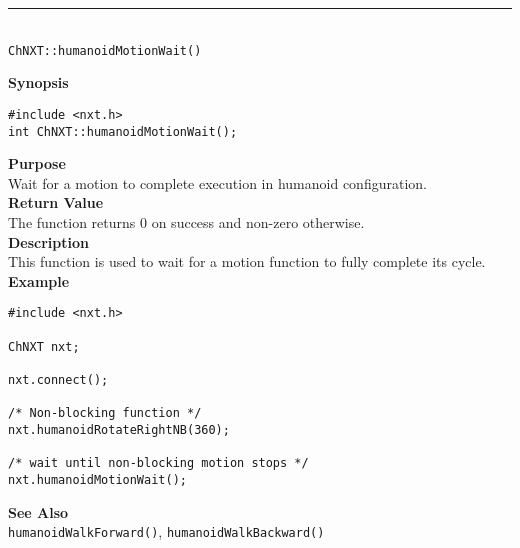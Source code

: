 \noindent
\vspace{5pt}
\rule{4.5in}{0.015in}\\
\noindent
{\LARGE \texttt{ChNXT::humanoidMotionWait()}}\\
{}

\noindent
{\bf Synopsis}
\vspace{-8pt}
\begin{verbatim}
#include <nxt.h>
int ChNXT::humanoidMotionWait();
\end{verbatim}

\noindent
{\bf Purpose}\\
Wait for a motion to complete execution in humanoid configuration.\\

\noindent
{\bf Return Value}\\
The function returns 0 on success and non-zero otherwise.\\

\noindent
{\bf Description}\\
This function is used to wait for a motion function to fully complete its cycle.\\


\noindent
{\bf Example}\\
\begin{verbatim}
#include <nxt.h>

ChNXT nxt;

nxt.connect();

/* Non-blocking function */
nxt.humanoidRotateRightNB(360);

/* wait until non-blocking motion stops */
nxt.humanoidMotionWait();
\end{verbatim}

\noindent
{\bf See Also}\\
\texttt{humanoidWalkForward()}, \texttt{humanoidWalkBackward()}



